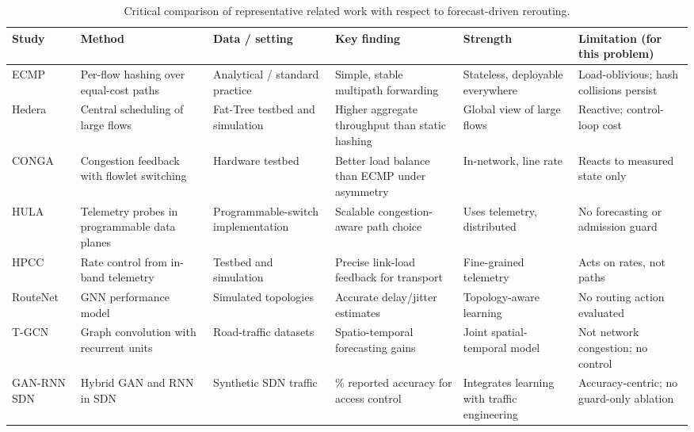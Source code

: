 \documentclass[conference]{IEEEtran}
\begin{document}
\begin{table}[!t]
\centering
\caption{Critical comparison of representative related work with respect to forecast-driven rerouting.}
\label{tab:litreview}
\footnotesize
\renewcommand{\arraystretch}{1.12}
\begin{tabular}{>{\raggedright\arraybackslash}p{1.9cm} >{\raggedright\arraybackslash}p{2.5cm} >{\raggedright\arraybackslash}p{2.2cm} >{\raggedright\arraybackslash}p{3.2cm} >{\raggedright\arraybackslash}p{2.7cm} >{\raggedright\arraybackslash}p{3.1cm}}
\toprule
\textbf{Study} & \textbf{Method} & \textbf{Data / setting} & \textbf{Key finding} & \textbf{Strength} & \textbf{Limitation (for this problem)}\\
\midrule
ECMP \cite{hopps2000} & Per-flow hashing over equal-cost paths & Analytical / standard practice & Simple, stable multipath forwarding & Stateless, deployable everywhere & Load-oblivious; hash collisions persist\\
Hedera \cite{alfares2010hedera} & Central scheduling of large flows & Fat-Tree testbed and simulation & Higher aggregate throughput than static hashing & Global view of large flows & Reactive; control-loop cost\\
CONGA \cite{alizadeh2014conga} & Congestion feedback with flowlet switching & Hardware testbed & Better load balance than ECMP under asymmetry & In-network, line rate & Reacts to measured state only\\
HULA \cite{katta2016hula} & Telemetry probes in programmable data planes & Programmable-switch implementation & Scalable congestion-aware path choice & Uses telemetry, distributed & No forecasting or admission guard\\
HPCC \cite{li2019hpcc} & Rate control from in-band telemetry & Testbed and simulation & Precise link-load feedback for transport & Fine-grained telemetry & Acts on rates, not paths\\
RouteNet \cite{rusek2020routenet} & GNN performance model & Simulated topologies & Accurate delay/jitter estimates & Topology-aware learning & No routing action evaluated\\
T-GCN \cite{zhao2020tgcn} & Graph convolution with recurrent units & Road-traffic datasets & Spatio-temporal forecasting gains & Joint spatial-temporal model & Not network congestion; no control\\
GAN-RNN SDN \cite{khekare2023ganrnn} & Hybrid GAN and RNN in SDN & Synthetic SDN traffic & 99.4\% reported accuracy for access control & Integrates learning with traffic engineering & Accuracy-centric; no guard-only ablation\\

\end{tabular}
\end{table}
\end{document}
